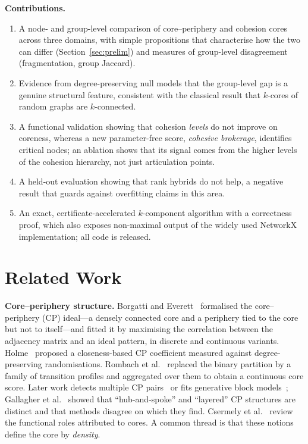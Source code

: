 \documentclass[conference]{IEEEtran}
\begin{document}
\textbf{Contributions.}
\begin{enumerate}
\item A node- and group-level comparison of core--periphery and cohesion cores across three domains,
with simple propositions that characterise how the two can differ (Section~\ref{sec:prelim}) and
measures of group-level disagreement (fragmentation, group Jaccard).
\item Evidence from degree-preserving null models that the group-level gap is a genuine structural
feature, consistent with the classical result that $k$-cores of random graphs are $k$-connected.
\item A functional validation showing that cohesion \emph{levels} do not improve on coreness, whereas a new
parameter-free score, \emph{cohesive brokerage}, identifies critical nodes; an ablation shows that its
signal comes from the higher levels of the cohesion hierarchy, not just articulation points.
\item A held-out evaluation showing that rank hybrids do not help, a negative result that guards against
overfitting claims in this area.
\item An exact, certificate-accelerated $k$-component algorithm with a correctness proof, which also
exposes non-maximal output of the widely used NetworkX implementation; all code is released.
\end{enumerate}

\section{Related Work}
\label{sec:related}
\textbf{Core--periphery structure.} Borgatti and Everett~\cite{borgatti2000models} formalised the
core--periphery (CP) ideal---a densely connected core and a periphery tied to the core but not to itself---and
fitted it by maximising the correlation between the adjacency matrix and an ideal pattern, in discrete
and continuous variants. Holme~\cite{holme2005core} proposed a closeness-based CP coefficient measured
against degree-preserving randomisations. Rombach et al.~\cite{rombach2014core,rombach2017revisited}
replaced the binary partition by a family of transition profiles and aggregated over them to obtain a
continuous core score. Later work detects multiple CP pairs~\cite{kojaku2017finding} or fits generative
block models~\cite{zhang2015identification}; Gallagher et al.~\cite{gallagher2021clarified} showed that
``hub-and-spoke'' and ``layered'' CP structures are distinct and that methods disagree on which they
find. Csermely et al.~\cite{csermely2013structure} review the functional roles attributed to cores. A
common thread is that these notions define the core by \emph{density}.
\end{document}
